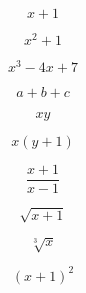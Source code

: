 \documentclass{article}
\begin{document}
\[
x+1
\]

\[
x^2+1
\]

\[
x^3-4x+7
\]

\[
a+b+c
\]

\[
xy
\]

\[
x(y+1)
\]

\[
\frac{x+1}{x-1}
\]

\[
\sqrt{x+1}
\]

\[
\sqrt[3]{x}
\]

\[
(x+1)^2
\]
\end{document}
